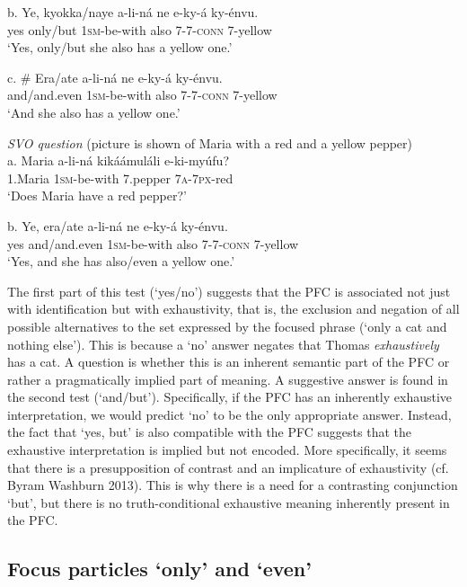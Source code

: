 \documentclass[output=paper]{langsci/langscibook}
\begin{document}
\ea
\gll   b.  Ye,  kyokka/naye  a-li-ná  ne  e-ky-á    ky-énvu.\\
         yes  only/but  \textsc{1sm}-be-with  also  \textsc{7}-\textsc{7}-\textsc{conn}  7-yellow\\
\glt     ‘Yes, only/but she also has a yellow one.’
\z

\ea
\gll   c.  \# Era/ate  a-li-ná  ne  e-ky-á    ky-énvu.\\
         and/and.even  \textsc{1sm}-be-with  also  \textsc{7}-\textsc{7}-\textsc{conn}  7-yellow\\
\glt     ‘And she also has a yellow one.’
\z

\ea
{\textit{SVO question}}
       (picture is shown of Maria with a red and a yellow pepper)\\
\gll   a.  Maria    a-li-ná  kikáámuláli  e-ki-myúfu?\\
         1.Maria  \textsc{1sm}-be-with  7.pepper  \textsc{7a}-\textsc{7px}-red\\
\glt     ‘Does Maria have a red pepper?’
\z

\ea
\gll   b.  Ye,  era/ate  a-li-ná  ne  e-ky-á    ky-énvu.\\
         yes  and/and.even  \textsc{1sm}-be-with  also  \textsc{7}-\textsc{7}-\textsc{conn}  7-yellow\\
\glt     ‘Yes, and she has also/even a yellow one.’
\z

The first part of this test (‘yes/no’) suggests that the PFC is associated not just with identification but with exhaustivity, that is, the exclusion and negation of all possible alternatives to the set expressed by the focused phrase (‘only a cat and nothing else’). This is because a ‘no’ answer negates that Thomas \textit{exhaustively} has a cat. A question is whether this is an inherent semantic part of the PFC or rather a pragmatically implied part of meaning. A suggestive answer is found in the second test (‘and/but’). Specifically, if the PFC has an inherently exhaustive interpretation, we would predict ‘no’ to be the only appropriate answer. Instead, the fact that ‘yes, but’ is also compatible with the PFC suggests that the exhaustive interpretation is implied but not encoded. More specifically, it seems that there is a presupposition of contrast and an implicature of exhaustivity (cf. Byram Washburn 2013). This is why there is a need for a contrasting conjunction ‘but’, but there is no truth-conditional exhaustive meaning inherently present in the PFC. 

\subsection{Focus particles ‘only’ and ‘even’} %
\end{document}
